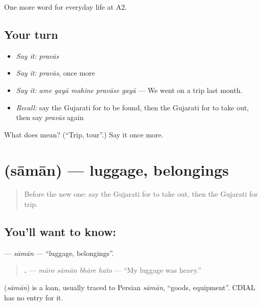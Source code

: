\begin{grammarlens}[title={What you've built}]
One more word for everyday life at A2.
\end{grammarlens}

\subsection*{Your turn}
\begin{itemize}
\raggedright
  \item \emph{Say it:} \emph{pravās}
  \item \emph{Say it:} \emph{pravās}, once more
  \item \emph{Say it:} \emph{ame gayā mahine pravāse gayā} — We went on a trip last month.
  \item \emph{Recall:} say the Gujarati for to be found, then the Gujarati for to take out, then say \emph{pravās} again
\end{itemize}

\begin{tcolorbox}[breakable,colback=teal!4,colframe=teal!35!black,title={Before you move on}]
What does  mean? (\textquotedblleft{}Trip, tour\textquotedblright{}.) Say it once more.
\end{tcolorbox}
\section[\texorpdfstring{\gu{સામાન} (sāmān)}{સામાન (sāmān)}]{ (sāmān) — luggage, belongings}

\label{lesson:GU-C203-saman}



\begin{quote}
Before the new one: say the Gujarati for to take out, then the Gujarati for trip.
\end{quote}

\subsection*{You'll want to know: }
\textbf{} — \emph{sāmān} — \textquotedblleft{}luggage, belongings\textquotedblright{}.

\begin{quote}
\textbf{   .} — \emph{māro sāmān bhāre hato} — \textquotedblleft{}My luggage was heavy.\textquotedblright{}
\end{quote}

\begin{cousinweb}
\textbf{} (\emph{sāmān}) is a loan, usually traced to Persian \emph{sāmān}, \textquotedblleft{}goods, equipment\textquotedblright{}. CDIAL has no entry for it.
\end{cousinweb}

